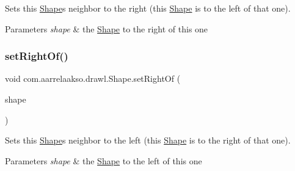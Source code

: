 Sets this \hyperlink{classcom_1_1aarrelaakso_1_1drawl_1_1_shape}{Shape}\textquotesingle{}s neighbor to the right (this \hyperlink{classcom_1_1aarrelaakso_1_1drawl_1_1_shape}{Shape} is to the left of that one). 


\begin{DoxyParams}{Parameters}
{\em shape} & the \hyperlink{classcom_1_1aarrelaakso_1_1drawl_1_1_shape}{Shape} to the right of this one \\
\hline
\end{DoxyParams}
\mbox{\label{classcom_1_1aarrelaakso_1_1drawl_1_1_shape_a3cada5e03bd1552a79702d2945c7ed01}} 
\subsubsection{\texorpdfstring{set\+Right\+Of()}{setRightOf()}\hspace{0.1cm}{\footnotesize\ttfamily [1/2]}}
{\footnotesize\ttfamily void com.\+aarrelaakso.\+drawl.\+Shape.\+set\+Right\+Of (\begin{DoxyParamCaption}\item[{@Not\+Null final \hyperlink{classcom_1_1aarrelaakso_1_1drawl_1_1_shape}{Shape}}]{shape }\end{DoxyParamCaption})\hspace{0.3cm}{\ttfamily [inherited]}}



Sets this \hyperlink{classcom_1_1aarrelaakso_1_1drawl_1_1_shape}{Shape}\textquotesingle{}s neighbor to the left (this \hyperlink{classcom_1_1aarrelaakso_1_1drawl_1_1_shape}{Shape} is to the right of that one). 


\begin{DoxyParams}{Parameters}
{\em shape} & the \hyperlink{classcom_1_1aarrelaakso_1_1drawl_1_1_shape}{Shape} to the left of this one \\
\hline
\end{DoxyParams}
\mbox{\label{classcom_1_1aarrelaakso_1_1drawl_1_1_shape_a89e85848d24dca0fa60ff68d169eef11}} 
